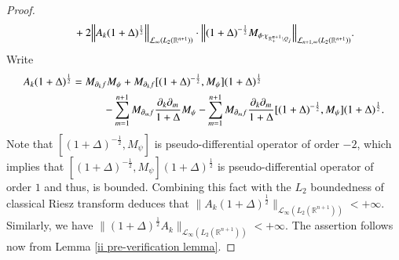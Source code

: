 \documentclass[12pt]{amsart}
\begin{document}
\begin{proof}
\begin{align*}
&\hspace{1.0cm}+2\Big\|A_k(1+\Delta)^{\frac12}\Big\|_{\mathcal{L}_{\infty}(L_2(\mathbb{R}^{n+1}))}\cdot \Big\|(1+\Delta)^{-\frac12}M_{\phi\cdot\chi_{\mathbb{R}^{n+1}_+\backslash Q_j}}\Big\|_{\mathcal{L}_{n+1,\infty}(L_2(\mathbb{R}^{n+1}))}.
\end{align*}
{\color{blue}Write
\begin{align*}
A_k(1+\Delta)^{\frac12}&=M_{\partial_kf}M_\psi+M_{\partial_kf}[(1+\Delta)^{-\frac{1}{2}},M_\psi](1+\Delta)^{\frac{1}{2}}\\
&\hspace{1.0cm}-\sum_{m=1}^{n+1}M_{\partial_mf}\frac{\partial_k\partial_m}{1+\Delta}M_\psi-\sum_{m=1}^{n+1}M_{\partial_mf}\frac{\partial_k\partial_m}{1+\Delta}[(1+\Delta)^{-\frac{1}{2}},M_\psi](1+\Delta)^{\frac{1}{2}}.
\end{align*}
Note that $[(1+\Delta)^{-\frac{1}{2}},M_\psi]$ is pseudo-differential operator of order $-2$, which implies that $[(1+\Delta)^{-\frac{1}{2}},M_\psi](1+\Delta)^{\frac{1}{2}}$ is pseudo-differential operator of order $1$ and thus, is bounded. Combining this fact with the $L_2$ boundedness of classical Riesz transform deduces that $\Big\|A_k(1+\Delta)^{\frac12}\Big\|_{\mathcal{L}_{\infty}(L_2(\mathbb{R}^{n+1}))}<+\infty$.
Similarly, we have $\Big\|(1+\Delta)^{\frac12}A_k\Big\|_{\mathcal{L}_{\infty}(L_2(\mathbb{R}^{n+1}))}<+\infty$. }The assertion follows now from Lemma \ref{ii pre-verification lemma}.
\end{proof}
\end{document}
